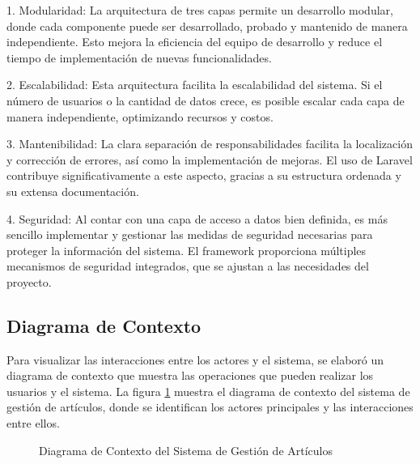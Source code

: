 1. Modularidad: La arquitectura de tres capas permite un desarrollo modular, donde cada componente puede ser desarrollado, probado y mantenido de manera independiente. Esto mejora la eficiencia del equipo de desarrollo y reduce el tiempo de implementación de nuevas funcionalidades.

2. Escalabilidad: Esta arquitectura facilita la escalabilidad del sistema. Si el número de usuarios o la cantidad de datos crece, es posible escalar cada capa de manera independiente, optimizando recursos y costos.

3. Mantenibilidad: La clara separación de responsabilidades facilita la localización y corrección de errores, así como la implementación de mejoras. El uso de Laravel contribuye significativamente a este aspecto, gracias a su estructura ordenada y su extensa documentación.

4. Seguridad: Al contar con una capa de acceso a datos bien definida, es más sencillo implementar y gestionar las medidas de seguridad necesarias para proteger la información del sistema. El framework proporciona múltiples mecanismos de seguridad integrados, que se ajustan a las necesidades del proyecto.


\subsection{Diagrama de Contexto}
Para visualizar las interacciones entre los actores y el sistema, se elaboró un diagrama de contexto que muestra las operaciones que pueden realizar los usuarios y el sistema. La figura \ref{fig:diagrama-contexto} muestra el diagrama de contexto del sistema de gestión de artículos, donde se identifican los actores principales y las interacciones entre ellos.

\begin{figure}[H]
    \centering
    \caption{Diagrama de Contexto del Sistema de Gestión de Artículos}
    \label{fig:diagrama-contexto}
\end{figure}


